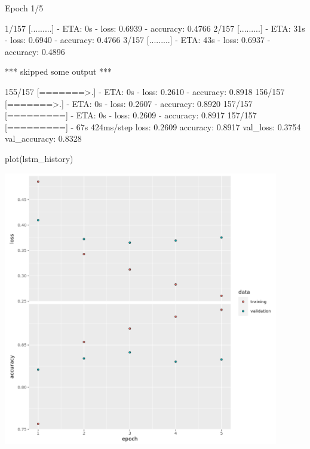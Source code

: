 \documentclass[
  12pt,
]{krantz}
\makeatletter
\newenvironment{Shaded}{\begin{snugshade}}{\end{snugshade}}
\newcommand{\FunctionTok}[1]{\textcolor[rgb]{0,0,0}{#1}}
\newcommand{\NormalTok}[1]{#1}
\newenvironment{kframe}{%
\medskip{}
\setlength{\fboxsep}{.8em}
 \def\at@end@of@kframe{}%
 \ifinner\ifhmode%
  \def\at@end@of@kframe{\end{minipage}}%
  \begin{minipage}{\columnwidth}%
 \fi\fi%
 \def\FrameCommand##1{\hskip\@totalleftmargin \hskip-\fboxsep
 \colorbox{shadecolor}{##1}\hskip-\fboxsep
     \hskip-\linewidth \hskip-\@totalleftmargin \hskip\columnwidth}%
 \MakeFramed {\advance\hsize-\width
   \@totalleftmargin\z@ \linewidth\hsize
   \@setminipage}}%
 {\par\unskip\endMakeFramed%
 \at@end@of@kframe}
\renewenvironment{Shaded}{\begin{kframe}}{\end{kframe}}
\makeatother
\begin{document}
\begin{Shaded}
\begin{Highlighting}[]
\NormalTok{Epoch 1/5}

\NormalTok{  1/157 [.........] {-} ETA: 0s {-} loss: 0.6939 {-} accuracy: 0.4766}
\NormalTok{  2/157 [.........] {-} ETA: 31s {-} loss: 0.6940 {-} accuracy: 0.4766}
\NormalTok{  3/157 [.........] {-} ETA: 43s {-} loss: 0.6937 {-} accuracy: 0.4896}

\NormalTok{*** skipped some output ***}

\NormalTok{155/157 [=======\textgreater{}.] {-} ETA: 0s {-} loss: 0.2610 {-} accuracy: 0.8918}
\NormalTok{156/157 [=======\textgreater{}.] {-} ETA: 0s {-} loss: 0.2607 {-} accuracy: 0.8920}
\NormalTok{157/157 [=========] {-} ETA: 0s {-} loss: 0.2609 {-} accuracy: 0.8917}
\NormalTok{157/157 [=========] {-} 67s 424ms/step }
\NormalTok{loss: 0.2609 accuracy: 0.8917 val\_loss: 0.3754 val\_accuracy: 0.8328}
\end{Highlighting}
\end{Shaded}

\begin{Shaded}
\begin{Highlighting}[]
\FunctionTok{plot}\NormalTok{(lstm\_history)}
\end{Highlighting}
\end{Shaded}

\includegraphics[width=0.9\textwidth,height=\textheight]{images/rnnhandson2.png}
\end{document}
